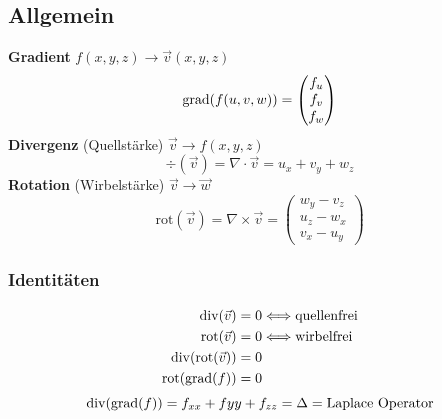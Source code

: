 \subsection{Allgemein} \vskip3pt
    \textbf{Gradient} \hfill $ f(x,y,z) \rightarrow \vec{v}(x,y,z)$
    $$
     \mathrm{grad}(f(u,v,w)) = \begin{pmatrix}
         f_u \\ f_v \\ f_w \end{pmatrix}
    $$
    \textbf{Divergenz} (Quellstärke) \hfill $\vec{v} \rightarrow f(x,y,z)$
        $$
            \mathrm{\div}(\vec{v}) = \nabla \cdot \vec{v} = u_x + v_y + w_z
        $$
    \textbf{Rotation} (Wirbelstärke) \hfill $\vec{v} \rightarrow \vec{w}$
        $$
            \mathrm{rot}(\vec{v}) = \nabla \times \vec{v} = 
            \begin{pmatrix}
                w_y - v_z\\ u_z - w_x\\v_x - u_y
            \end{pmatrix}
        $$
    \subsubsection{Identitäten}
        \vspace{-1em}
        \begin{align*}
            \mathrm{div}(\vec{v}) = 0 & \Longleftrightarrow \textrm{quellenfrei}\\
            \mathrm{rot}(\vec{v}) = 0 & \Longleftrightarrow\textrm{wirbelfrei} \\
            \mathrm{div}(\mathrm{rot}(\vec{v})) = 0 & \\
            \mathrm{rot}(\mathrm{grad}(f)) = 0 & \\
        \end{align*} 
        $$\mathrm{div}(\mathrm{grad}(f)) = f_{xx} + f{yy} + f_{zz} = \Delta = \textrm{Laplace Operator}$$